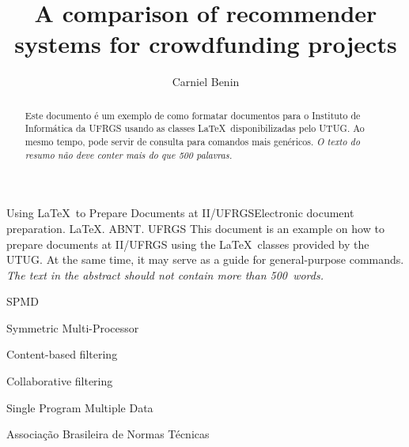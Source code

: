 \documentclass[cic,tc,english]{iiufrgs}
\title{A comparison of recommender systems for crowdfunding projects}
\author{Carniel Benin}{Adriano}
\begin{document}
\maketitle





\begin{abstract}
    Este documento é um exemplo de como formatar documentos para o
    Instituto de Informática da UFRGS usando as classes \LaTeX\
    disponibilizadas pelo UTUG\@. Ao mesmo tempo, pode servir de consulta
    para comandos mais genéricos. \emph{O texto do resumo não deve
      conter mais do que 500 palavras.}
\end{abstract}

\begin{englishabstract}{Using \LaTeX\ to Prepare Documents at II/UFRGS}{Electronic document preparation. \LaTeX. ABNT. UFRGS}
    This document is an example on how to prepare documents at II/UFRGS
    using the \LaTeX\ classes provided by the UTUG\@. At the same time, it
    may serve as a guide for general-purpose commands. \emph{The text in
      the abstract should not contain more than 500~words.}
\end{englishabstract}

\listoffigures

\listoftables

\begin{listofabbrv}{SPMD}
    \item[SMP] Symmetric Multi-Processor
    \item[CBF] Content-based filtering
    \item[CF] Collaborative filtering
    \item[SPMD] Single Program Multiple Data
    \item[ABNT] Associação Brasileira de Normas Técnicas
\end{listofabbrv}
\end{document}
